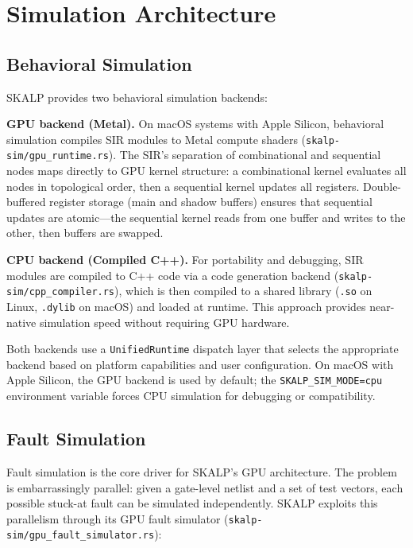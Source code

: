 \documentclass[conference]{IEEEtran}
\begin{document}
\section{Simulation Architecture}
\label{sec:simulation}

\subsection{Behavioral Simulation}

SKALP provides two behavioral simulation backends:

\textbf{GPU backend (Metal).} On macOS systems with Apple Silicon, behavioral simulation compiles SIR modules to Metal compute shaders (\texttt{skalp-sim/gpu\_runtime.rs}). The SIR's separation of combinational and sequential nodes maps directly to GPU kernel structure: a combinational kernel evaluates all nodes in topological order, then a sequential kernel updates all registers. Double-buffered register storage (main and shadow buffers) ensures that sequential updates are atomic---the sequential kernel reads from one buffer and writes to the other, then buffers are swapped.

\textbf{CPU backend (Compiled C++).} For portability and debugging, SIR modules are compiled to C++ code via a code generation backend (\texttt{skalp-sim/cpp\_compiler.rs}), which is then compiled to a shared library (\texttt{.so} on Linux, \texttt{.dylib} on macOS) and loaded at runtime. This approach provides near-native simulation speed without requiring GPU hardware.

Both backends use a \texttt{UnifiedRuntime} dispatch layer that selects the appropriate backend based on platform capabilities and user configuration. On macOS with Apple Silicon, the GPU backend is used by default; the \texttt{SKALP\_SIM\_MODE=cpu} environment variable forces CPU simulation for debugging or compatibility.

\subsection{Fault Simulation}

Fault simulation is the core driver for SKALP's GPU architecture. The problem is embarrassingly parallel: given a gate-level netlist and a set of test vectors, each possible stuck-at fault can be simulated independently. SKALP exploits this parallelism through its GPU fault simulator (\texttt{skalp-sim/gpu\_fault\_simulator.rs}):
\end{document}
